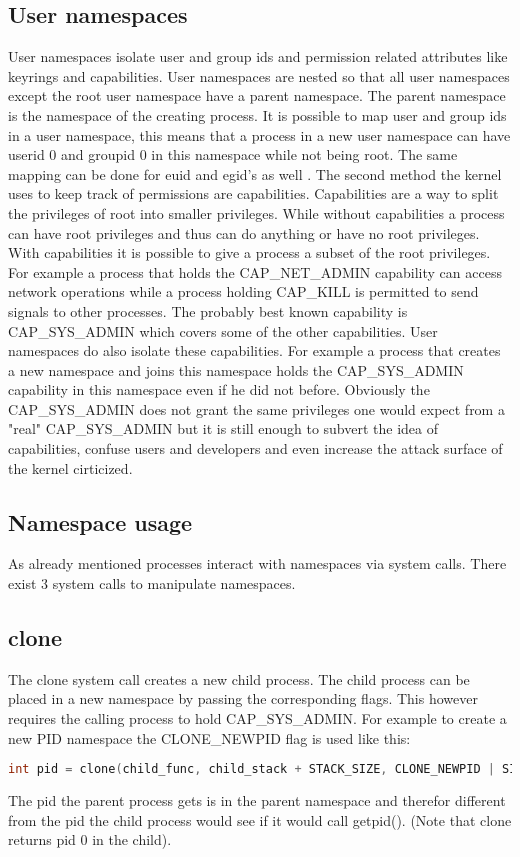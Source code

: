 \documentclass[10pt,twocolumn,a4paper]{article}
\begin{document}
\subsection{User namespaces}
User namespaces isolate user and group ids and permission related attributes like keyrings and
capabilities. User namespaces are nested so that all user namespaces except the root user namespace
have a parent namespace. The parent namespace is the namespace of the creating process. 
It is possible to map user and group ids in a user namespace, this means that a process in a new user
namespace can have userid 0 and groupid 0 in this namespace while not being root. The same mapping
can be done for euid and egid's as well \cite{18}. The second method the kernel uses to keep track
of permissions are capabilities. Capabilities are a way to split the privileges of root into smaller
privileges. While without capabilities a process can have root privileges and thus can do anything
or have no root privileges. With capabilities it is possible to give a process a subset of the root
privileges. For example a process that holds the CAP\_NET\_ADMIN capability can access network
operations while a process holding CAP\_KILL is permitted to send signals to other
processes\cite{19}. The probably best known capability is CAP\_SYS\_ADMIN which covers some of the
other capabilities. 
User namespaces do also isolate these capabilities. For example a process that creates a new
namespace and joins this namespace holds the CAP\_SYS\_ADMIN capability in this namespace even if he
did not before. Obviously the CAP\_SYS\_ADMIN does not grant the same privileges one would expect from
a "real" CAP\_SYS\_ADMIN but it is still enough to subvert the idea of capabilities, confuse users and
developers and even increase the attack surface of the kernel cirticized\cite{20}. 

\subsection{Namespace usage}
As already mentioned processes interact with namespaces via system calls. There exist 3 system calls
to manipulate namespaces. 
\subsection{ clone}
The clone system call creates a new child process. The child process can be placed in a new
namespace by passing the corresponding flags. This however requires the calling process to hold
CAP\_SYS\_ADMIN. For example to create a new PID namespace the CLONE\_NEWPID flag is used like this:
\begin{lstlisting}[language=C]
    int pid = clone(child_func, child_stack + STACK_SIZE, CLONE_NEWPID | SIGCHLD, NULL);
\end{lstlisting}
The pid the parent process gets is in the parent namespace and therefor different from the pid the
child process would see if it would call getpid(). (Note that clone returns pid 0 in the
child)\cite{22}.
\end{document}
